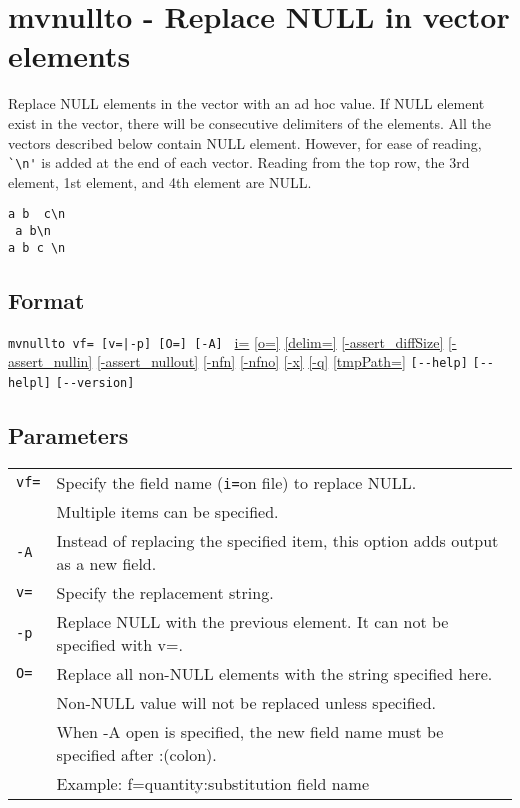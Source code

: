 
\section{mvnullto - Replace NULL in vector elements\label{sect:mvnullto}}
Replace NULL elements in the vector with an ad hoc value. 
If NULL element exist in the vector, there will be consecutive delimiters of the elements. 
All the vectors described below contain NULL element.
However, for ease of reading, \verb|`\n'| is added at the end of each vector. 
Reading from the top row, the 3rd element, 1st element, and 4th element are NULL.
\begin{Verbatim}[baselinestretch=0.7,frame=single]
a b  c\n
 a b\n
a b c \n
\end{Verbatim}

\subsection*{Format}
\verb/mvnullto vf= [v=|-p] [O=] [-A] /
\hyperref[sect:option_i]{i=}
\hyperref[sect:option_o]{[o=]}
\hyperref[sect:option_delim]{[delim=]} 
\hyperref[sect:option_assert_diffSize]{[-assert\_diffSize]}
\hyperref[sect:option_assert_nullin]{[-assert\_nullin]}
\hyperref[sect:option_assert_nullout]{[-assert\_nullout]}
\hyperref[sect:option_nfn]{[-nfn]} 
\hyperref[sect:option_nfno]{[-nfno]}  
\hyperref[sect:option_x]{[-x]}
\hyperref[sect:option_q]{[-q]}
\hyperref[sect:option_option_tmppath]{[tmpPath=]}
\verb|[--help]|
\verb|[--helpl]|
\verb|[--version]|\\

\subsection*{Parameters}
\begin{table}[htbp]
{\small
\begin{tabular}{ll}
\verb|vf=| & Specify the field name (\verb|i=|on file) to replace NULL.\\
           & Multiple items can be specified.\\
\verb|-A|  & Instead of replacing the specified item, this option adds output as a new field. \\
\verb|v=|  & Specify the replacement string.\\
\verb|-p|  & Replace NULL with the previous element. It can not be specified with v=.\\
\verb|O=|  & Replace all non-NULL elements with the string specified here.\\
           & Non-NULL value will not be replaced unless specified.\\
           & When -A open is specified, the new field name must be specified after :(colon).\\
           & Example:  f=quantity:substitution field name\\

\end{tabular}
}
\end{table} 

